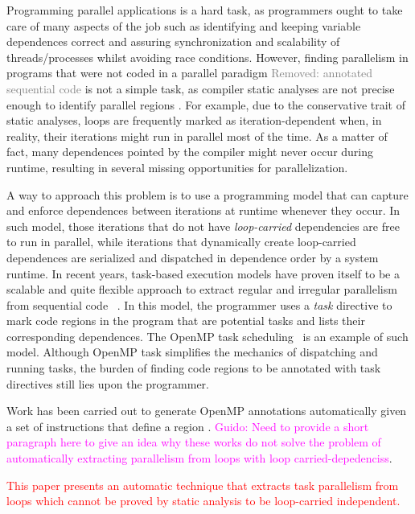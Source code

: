 \documentclass[pageno]{jpaper}
\newcommand{\guido}[1]{\noindent\textcolor{magenta}{Guido: {#1}}}
\newcommand{\rmv}[1]{\noindent\textcolor{gray}{Removed: {#1}}}
\newcommand{\ed}[1]{\noindent\textcolor{red}{ {#1}}}
\newcommand{\guido}[1]{}
\newcommand{\rmv}[1]{}
\newcommand{\ed}[1]{}
\begin{document}
Programming parallel applications is a hard task, as programmers ought to take care of many aspects of the job such as identifying and keeping variable dependences correct and assuring synchronization and scalability of threads/processes whilst avoiding race conditions. However, finding parallelism in programs that were not coded in a parallel paradigm \rmv{annotated sequential  code} is not a simple task, as compiler static analyses are not precise enough to identify  parallel regions \cite{kulkarni2007optimistic}. For example, due  to the conservative trait of static analyses, loops are frequently marked as iteration-dependent when, in reality, their iterations might run in parallel most of the time. As a matter of fact,  many dependences pointed by the compiler might never occur during runtime, resulting in several missing opportunities for parallelization.

A way to approach this problem is to use a programming model that can capture and enforce dependences between iterations at runtime whenever they occur. In such model, those iterations that do not have {\it loop-carried} dependencies are free to run in parallel, while iterations that dynamically create loop-carried dependences are serialized and dispatched in dependence order by  a system runtime.  In recent years, task-based execution models  have proven itself to be a scalable and quite flexible approach to extract regular and irregular parallelism from sequential code ~\cite{starss,bddt,cilk,sequoia,dandelion,legion,ooojava,dague}. In this model, the programmer uses a {\it task} directive to mark  code regions in the program that are potential tasks and lists their corresponding dependences.  The OpenMP task scheduling~\cite{openmp2009}  is an example of such model. Although OpenMP task simplifies the mechanics of dispatching and running tasks, the burden of finding code regions to be annotated with task directives still lies upon the programmer.

Work has been carried out to generate OpenMP annotations automatically given a set of instructions that define  a region \cite{gleison2016, pingali2011tao, wanggenerating}. \guido{Need to provide a short paragraph here to give an idea why these works do not solve the problem of automatically extracting parallelism from loops with loop carried-depedenciss}.

\ed{This paper presents an automatic technique that extracts task parallelism from loops which cannot be proved by static analysis to be loop-carried independent. } 
\end{document}
